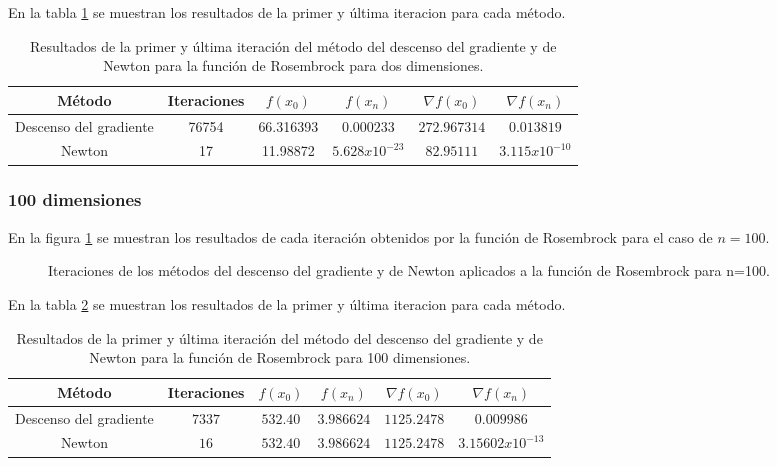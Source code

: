 En la tabla \ref{table:rosembrock_2_random} se muestran los resultados de la primer y última iteracion para cada método.

\begin{table}[H]
    \centering
    \begin{tabular}{cccccc} \hline
        Método                 & Iteraciones & $f(x_0)$  & $f(x_n)$         & $\nabla f(x_0)$ & $\nabla f(x_n) $ \\ \hline
        Descenso del gradiente & 76754       & 66.316393 & $0.000233$       & $272.967314$    & $0.013819$       \\
        Newton                 & 17          & 11.98872  & $5.628x10^{-23}$ & $82.95111$      & $3.115x10^{-10}$ \\ \hline
    \end{tabular}
    \caption{Resultados de la primer y última iteración del método del descenso del gradiente y de Newton para la función de Rosembrock para dos dimensiones.}
    \label{table:rosembrock_2_random}
\end{table}

\subsubsection{100 dimensiones}

En la figura \ref{fig:rosembrock_100} se muestran los resultados de cada iteración obtenidos por la función de Rosembrock para el caso de $n=100$.

\begin{figure}[H]
    \centering
    \caption{Iteraciones de los métodos del descenso del gradiente y de Newton aplicados a la función de Rosembrock para n=100.}
    \label{fig:rosembrock_100}
\end{figure}

En la tabla \ref{table:rosembrock_100} se muestran los resultados de la primer y última iteracion para cada método.

\begin{table}[H]
    \centering
    \begin{tabular}{cccccc} \hline
        Método                 & Iteraciones & $f(x_0)$  & $f(x_n)$   & $\nabla f(x_0)$ & $\nabla f(x_n) $   \\ \hline
        Descenso del gradiente & $7337$      & $532.40 $ & $3.986624$ & $1125.2478$     & $0.009986$         \\
        Newton                 & $16$        & $532.40$  & $3.986624$ & $1125.2478$     & $3.15602x10^{-13}$ \\ \hline
    \end{tabular}
    \caption{Resultados de la primer y última iteración del método del descenso del gradiente y de Newton para la función de Rosembrock para 100 dimensiones.}
    \label{table:rosembrock_100}
\end{table}

